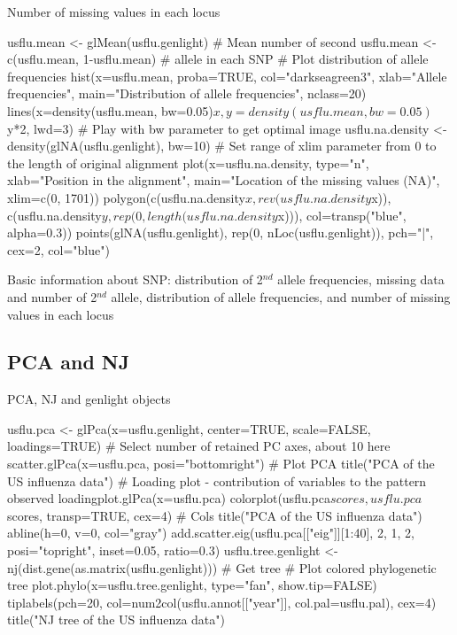 \documentclass[compress, xelatex, 11pt, xcolor=svgnames, aspectratio=169,
	hyperref={
		bookmarks=true,
		unicode=true,
		colorlinks=true,
		pdftitle={Molecular data in R},
		plainpages=false,
		pdfauthor={Vojtech Zeisek},
		pdfsubject={Course about phylogeny and evolution in R},
		pdfcreator={XeLaTeX},
		pdfkeywords={R, evolution, phylogeny, molecular data},
		linkcolor=Crimson, %
		anchorcolor=Magenta, %
		citecolor=Magenta, %
		filecolor=Magenta, %
		menucolor=Magenta, %
		urlcolor=DodgerBlue, %
		},
	url={hyphens, lowtilde} %
	]{beamer}
\renewcommand{\texttt}[1]{\colorbox{Beige}{{\ttfamily #1}}}
\begin{document}
\begin{frame}[fragile]{Number of missing values in each locus}
	\begin{spluscode}
    usflu.mean <- glMean(usflu.genlight)      # Mean number of second
    usflu.mean <- c(usflu.mean, 1-usflu.mean) # allele in each SNP
    # Plot distribution of allele frequencies
    hist(x=usflu.mean, proba=TRUE, col="darkseagreen3", xlab="Allele
      frequencies", main="Distribution of allele frequencies", nclass=20)
    lines(x=density(usflu.mean, bw=0.05)$x, y=density(usflu.mean, bw=0.05)$y*2,
      lwd=3)
    # Play with bw parameter to get optimal image
    usflu.na.density <- density(glNA(usflu.genlight), bw=10)
    # Set range of xlim parameter from 0 to the length of original alignment
    plot(x=usflu.na.density, type="n", xlab="Position in the alignment",
      main="Location of the missing values (NA)", xlim=c(0, 1701))
    polygon(c(usflu.na.density$x, rev(usflu.na.density$x)),
      c(usflu.na.density$y, rep(0, length(usflu.na.density$x))),
      col=transp("blue", alpha=0.3))
    points(glNA(usflu.genlight), rep(0, nLoc(usflu.genlight)), pch="|", cex=2,
      col="blue")
	\end{spluscode}
\end{frame}

\begin{frame}{Basic information about SNP: distribution of 2$^{nd}$ allele frequencies, missing data and number of 2$^{nd}$ allele, distribution of allele frequencies, and number of missing values in each locus}
	\begin{center}
		\texttt{[image: flu\_alleles.png]}
	\end{center}
\end{frame}

\subsection{PCA and NJ}

\begin{frame}[fragile]{PCA, NJ and genlight objects}
	\begin{spluscode}
    usflu.pca <- glPca(x=usflu.genlight, center=TRUE, scale=FALSE,
      loadings=TRUE) # Select number of retained PC axes, about 10 here
    scatter.glPca(x=usflu.pca, posi="bottomright") # Plot PCA
    title("PCA of the US influenza data")
    # Loading plot - contribution of variables to the pattern observed
    loadingplot.glPca(x=usflu.pca)
    colorplot(usflu.pca$scores, usflu.pca$scores, transp=TRUE, cex=4) # Cols
    title("PCA of the US influenza data")
    abline(h=0, v=0, col="gray")
    add.scatter.eig(usflu.pca[["eig"]][1:40], 2, 1, 2, posi="topright",
      inset=0.05, ratio=0.3)
    usflu.tree.genlight <- nj(dist.gene(as.matrix(usflu.genlight))) # Get tree
    # Plot colored phylogenetic tree
    plot.phylo(x=usflu.tree.genlight, type="fan", show.tip=FALSE)
    tiplabels(pch=20, col=num2col(usflu.annot[["year"]], col.pal=usflu.pal),
      cex=4)
    title("NJ tree of the US influenza data")
	\end{spluscode}
\end{frame}
\end{document}
